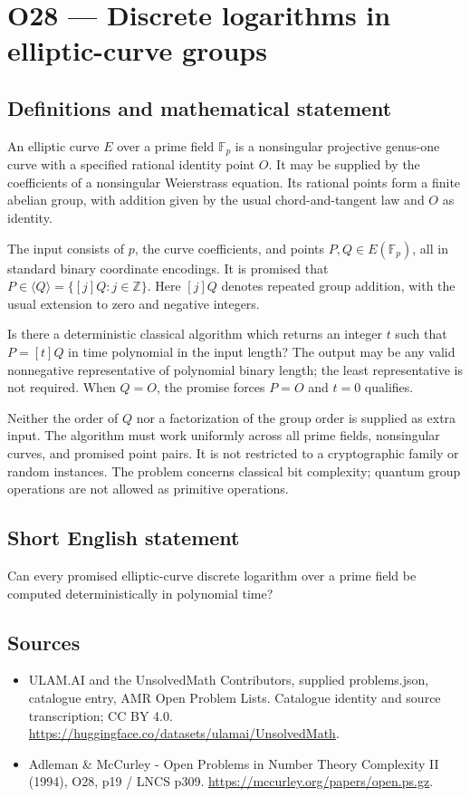 \documentclass[11pt,a4paper]{article}
\begin{document}
\section*{O28 — Discrete logarithms in elliptic-curve groups}\label{statement}

\subsection{Definitions and mathematical statement}
An elliptic curve $E$ over a prime field $\mathbb F_p$ is a nonsingular projective genus-one curve with a specified rational identity point $O$. It may be supplied by the coefficients of a nonsingular Weierstrass equation. Its rational points form a finite abelian group, with addition given by the usual chord-and-tangent law and $O$ as identity.

The input consists of $p$, the curve coefficients, and points $P,Q\in E(\mathbb F_p)$, all in standard binary coordinate encodings. It is promised that $P\in\langle Q\rangle=\{[j]Q:j\in\mathbb Z\}$. Here $[j]Q$ denotes repeated group addition, with the usual extension to zero and negative integers.

Is there a deterministic classical algorithm which returns an integer $t$ such that $P=[t]Q$ in time polynomial in the input length? The output may be any valid nonnegative representative of polynomial binary length; the least representative is not required. When $Q=O$, the promise forces $P=O$ and $t=0$ qualifies.

Neither the order of $Q$ nor a factorization of the group order is supplied as extra input. The algorithm must work uniformly across all prime fields, nonsingular curves, and promised point pairs. It is not restricted to a cryptographic family or random instances. The problem concerns classical bit complexity; quantum group operations are not allowed as primitive operations.
\subsection{Short English statement}
Can every promised elliptic-curve discrete logarithm over a prime field be computed deterministically in polynomial time?
\subsection{Sources}
\begin{itemize}
\item[S1] ULAM.AI and the UnsolvedMath Contributors, supplied problems.json, catalogue entry, AMR Open Problem Lists. Catalogue identity and source transcription; CC BY 4.0.
\url{https://huggingface.co/datasets/ulamai/UnsolvedMath}.
\item[S2] Adleman \& McCurley - Open Problems in Number Theory Complexity II (1994), O28, p19 / LNCS p309. 
\url{https://mccurley.org/papers/open.ps.gz}.
\end{itemize}
\end{document}
